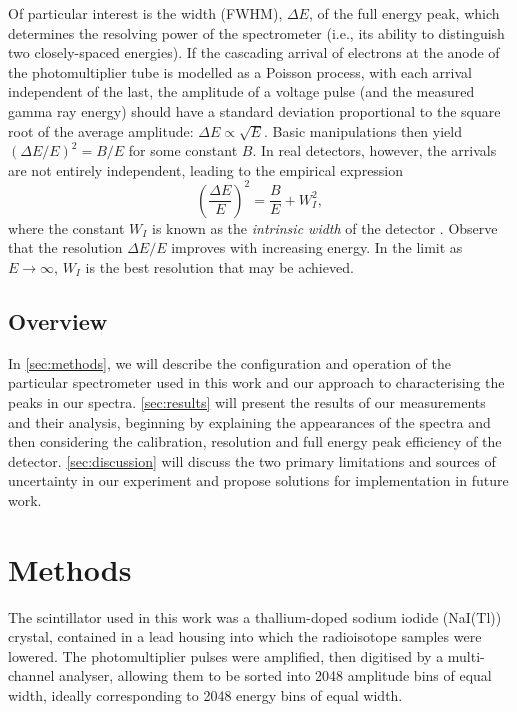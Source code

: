 \documentclass[twocol]{ametsocV6.1}
\begin{document}
Of particular interest is the width (FWHM), $\Delta E$, of the full energy peak,
which determines the resolving power of the spectrometer (i.e., its ability to
distinguish two closely-spaced energies). If the cascading arrival of
electrons at the anode of the photomultiplier tube is modelled as a Poisson
process, with each arrival independent of the last, the amplitude of a
voltage pulse (and the measured gamma ray energy) should have a standard
deviation proportional to the square root of the average amplitude:
$\Delta E \propto \sqrt{E}$. Basic manipulations then yield
$(\Delta E/E)^2 = B/E$ for some constant $B$. In real detectors, however,
the arrivals are not entirely independent, leading to the empirical expression
\begin{equation}
	\left( \frac{\Delta E}{E} \right)^2 = \frac{B}{E} + W_I^2,
	\label{eqn:resolution}
\end{equation}
where the constant $W_I$ is known as the \emph{intrinsic width} of the
detector \citep{notes}. Observe that the resolution $\Delta E/E$ improves
with increasing energy. In the limit as $E \to \infty$, $W_I$ is the
best resolution that may be achieved.

\subsection{Overview}
In \autoref{sec:methods}, we will describe the configuration and operation
of the particular spectrometer used in this work and our approach to
characterising the peaks in our spectra. \autoref{sec:results} will
present the results of our measurements and their analysis, beginning
by explaining the appearances of the spectra and then considering the
calibration, resolution and full energy peak efficiency of the detector.
\autoref{sec:discussion} will discuss the two primary limitations and sources
of uncertainty in our experiment and propose solutions for implementation
in future work.

\section{Methods} \label{sec:methods}
The scintillator used in this work was a thallium-doped sodium iodide
(NaI(Tl)) crystal, contained in a lead housing into which the radioisotope
samples were lowered. The photomultiplier pulses were amplified, then
digitised by a multi-channel analyser, allowing them to be sorted into
2048 amplitude bins of equal width, ideally corresponding to 2048 energy bins
of equal width.
\end{document}
